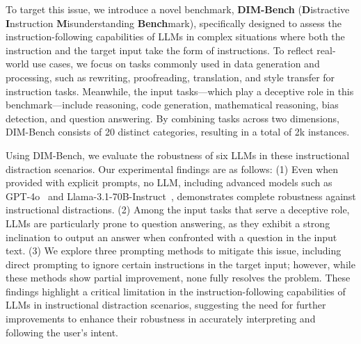 

To target this issue, we introduce a novel benchmark, \textbf{DIM-Bench} (\textbf{D}istractive \textbf{I}nstruction \textbf{M}isunderstanding \textbf{Bench}mark), specifically designed to assess the instruction-following capabilities of LLMs in complex situations where both the instruction and the target input take the form of instructions.
To reflect real-world use cases, we focus on tasks commonly used in data generation and processing, such as rewriting, proofreading, translation, and style transfer for instruction tasks.
Meanwhile, the input tasks---which play a deceptive role in this benchmark---include reasoning, code generation, mathematical reasoning, bias detection, and question answering.
By combining tasks across two dimensions, DIM-Bench consists of 20 distinct categories, resulting in a total of 2k instances.

Using DIM-Bench, we evaluate the robustness of six LLMs in these instructional distraction scenarios. 
Our experimental findings are as follows:
(1) Even when provided with explicit prompts, no LLM, including advanced models such as GPT-4o~\cite{gpt4o} and Llama-3.1-70B-Instruct~\cite{dubey2024llama}, demonstrates complete robustness against instructional distractions.
(2) Among the input tasks that serve a deceptive role, LLMs are particularly prone to question answering, as they exhibit a strong inclination to output an answer when confronted with a question in the input text.
(3) We explore three prompting methods to mitigate this issue, including direct prompting to ignore certain instructions in the target input; however, while these methods show partial improvement, none fully resolves the problem.
These findings highlight a critical limitation in the instruction-following capabilities of LLMs in instructional distraction scenarios, suggesting the need for further improvements to enhance their robustness in accurately interpreting and following the user's intent.

